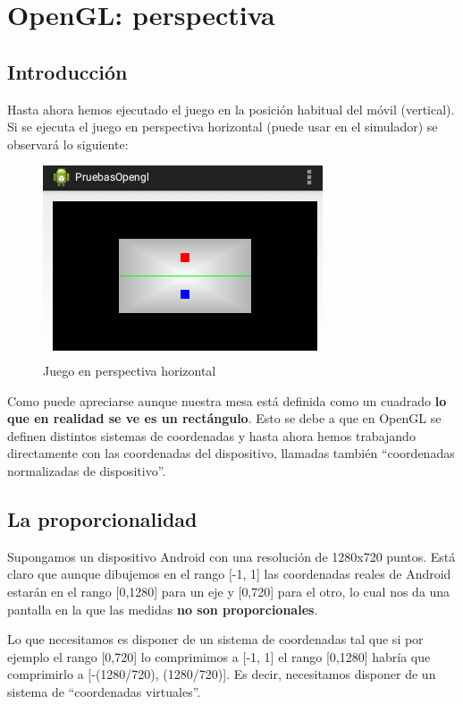 \documentclass[a4paper,12pt,spanish]{sphinxmanual}
\begin{document}
\chapter{OpenGL: perspectiva}
\label{cap5opengl:opengl-perspectiva}\label{cap5opengl::doc}

\section{Introducción}
\label{cap5opengl:introduccion}
Hasta ahora hemos ejecutado el juego en la posición habitual del móvil (vertical). Si se ejecuta el juego en perspectiva horizontal (puede usar  en el simulador) se observará lo siguiente:
\begin{figure}[htbp]
\centering
\capstart

\includegraphics{juegohorizontal.png}
\caption{Juego en perspectiva horizontal}\end{figure}

Como puede apreciarse aunque nuestra mesa está definida como un cuadrado \textbf{lo que en realidad se ve es un rectángulo}. Esto se debe a que en OpenGL se definen distintos sistemas de coordenadas y hasta ahora hemos trabajando directamente con las coordenadas del dispositivo, llamadas también ``coordenadas normalizadas de dispositivo''.


\section{La proporcionalidad}
\label{cap5opengl:la-proporcionalidad}
Supongamos un dispositivo Android con una resolución de 1280x720 puntos. Está claro que aunque dibujemos en el rango {[}-1, 1{]} las coordenadas reales de Android estarán en el rango  {[}0,1280{]} para un eje y {[}0,720{]} para el otro, lo cual nos da una pantalla en la que las medidas \textbf{no son proporcionales}.

Lo que necesitamos es disponer de un sistema de coordenadas tal que si por ejemplo el rango {[}0,720{]} lo comprimimos a {[}-1, 1{]} el rango {[}0,1280{]} habría que comprimirlo a {[}-(1280/720), (1280/720){]}. Es decir, necesitamos disponer de un sistema de ``coordenadas virtuales''.
\end{document}
